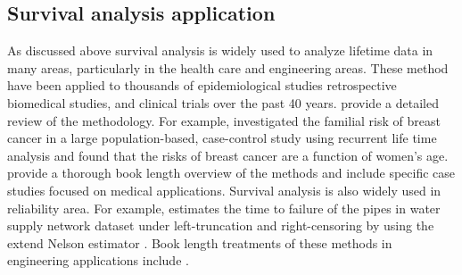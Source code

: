 \documentclass[12pt,letterpaper]{article}
\begin{document}



\subsection{Survival analysis application}
As discussed above survival analysis is widely used to analyze lifetime data in many areas, particularly in the health care and engineering areas.  These method have been applied to thousands of epidemiological studies retrospective biomedical studies, and clinical trials over the past 40 years. provide a detailed review of the methodology.  For example, \citet{claus1991} investigated the familial risk of breast cancer in a large population-based, case-control study using recurrent life time analysis and found that the risks of breast cancer are a function of women's age.  \citet{Kleinmoeschberger2003} provide a thorough book length overview of the methods and include specific case studies focused on medical applications.
Survival analysis is also widely used in reliability area. For example, \citet{carrion2010} estimates the time to failure of the pipes in water supply network dataset under left-truncation and right-censoring by using the extend Nelson estimator \citep{pan1998}.  Book length treatments of these methods in engineering applications include \citet{lawless2011,meeker2014}.
\end{document}
